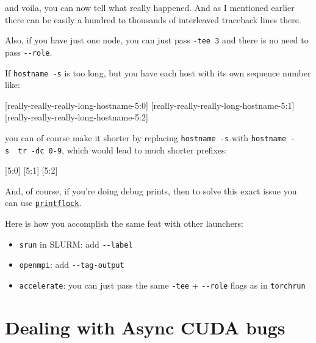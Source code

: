 \documentclass[
]{report}
\newenvironment{Shaded}{\begin{snugshade}}{\end{snugshade}}
\newcommand{\ExtensionTok}[1]{\textcolor[rgb]{0.00,0.23,0.31}{#1}}
\providecommand{\tightlist}{%
  \setlength{\itemsep}{0pt}\setlength{\parskip}{0pt}}\usepackage{longtable,booktabs,array}
\begin{document}
and voila, you can now tell what really happened. And as I mentioned
earlier there can be easily a hundred to thousands of interleaved
traceback lines there.

Also, if you have just one node, you can just pass \texttt{-tee\ 3} and
there is no need to pass \texttt{-\/-role}.

If \texttt{hostname\ -s} is too long, but you have each host with its
own sequence number like:

\begin{Shaded}
\begin{Highlighting}[]
\ExtensionTok{[really{-}really{-}really{-}long{-}hostname{-}5:0]}
\ExtensionTok{[really{-}really{-}really{-}long{-}hostname{-}5:1]}
\ExtensionTok{[really{-}really{-}really{-}long{-}hostname{-}5:2]}
\end{Highlighting}
\end{Shaded}

you can of course make it shorter by replacing \texttt{hostname\ -s}
with
\texttt{hostname\ -s\ \textbar{}\ tr\ -dc\ \textquotesingle{}0-9\textquotesingle{}},
which would lead to much shorter prefixes:

\begin{Shaded}
\begin{Highlighting}[]
\ExtensionTok{[5:0]}
\ExtensionTok{[5:1]}
\ExtensionTok{[5:2]}
\end{Highlighting}
\end{Shaded}

And, of course, if you're doing debug prints, then to solve this exact
issue you can use
\href{./torch-distributed-hanging-solutions.md\#good-old-print}{\texttt{printflock}}.

Here is how you accomplish the same feat with other launchers:

\begin{itemize}
\tightlist
\item
  \texttt{srun} in SLURM: add \texttt{-\/-label}
\item
  \texttt{openmpi}: add \texttt{-\/-tag-output}
\item
  \texttt{accelerate}: you can just pass the same \texttt{-tee} +
  \texttt{-\/-role} flags as in \texttt{torchrun}
\end{itemize}

\section{Dealing with Async CUDA
bugs}\label{dealing-with-async-cuda-bugs}
\end{document}
